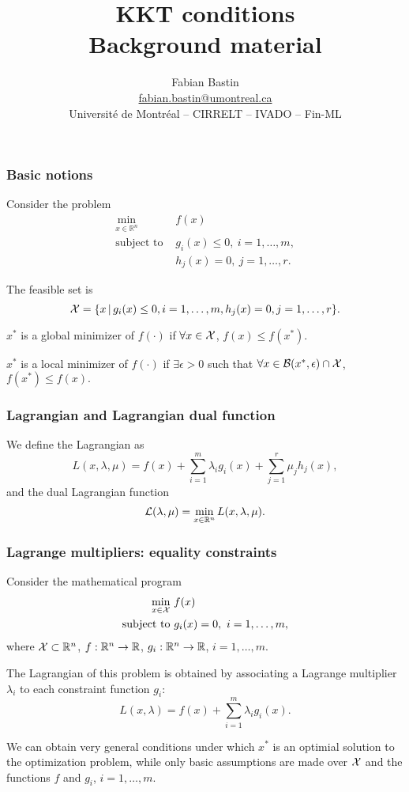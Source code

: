 \documentclass[usepdftitle=false]{beamer}
\author[Fabian Bastin]{Fabian Bastin \\ \url{fabian.bastin@umontreal.ca} \\ Université de Montréal -- CIRRELT -- IVADO -- Fin-ML}
\date{}
\title[Linear programming]{KKT conditions\\Background material}
\def\red{\color{red}}
\begin{document}
\frame{\titlepage}


\begin{frame}
\frametitle{Basic notions}

Consider the problem
\begin{align*}
	\min_{x \in \mathbb{R}^n} \ & f(x) \\
	\mbox{subject to } & g_i(x) \leq 0,\ i = 1,\ldots,m, \\
	& h_j(x) = 0,\ j = 1,\ldots,r.
\end{align*}

The feasible set is
$$
{\mathcal{X}} = \{ x \,|\, g_i(x) \leq 0, i = 1,\ldots,m, h_j(x) = 0, j = 1,\ldots,r \}.
$$

$x^*$ is a global minimizer of $f(\cdot)$ if $\forall x \in {\mathcal{X}}$, $f(x) \leq f(x^*)$.

$x^*$ is a local minimizer of $f(\cdot)$ if
$\exists \epsilon > 0$ such that $\forall x \in {\mathcal{B}}(x^*, \epsilon) \cap {\mathcal{X}}$, $f(x^*) \leq f(x).$

\end{frame}

\begin{frame}
	\frametitle{Lagrangian and Lagrangian dual function}
	
We define the Lagrangian as
	$$
	L(x, \lambda, \mu) = f(x) + \sum_{i = 1}^m \lambda_i g_i(x)
	+ \sum_{j = 1}^r \mu_j h_j(x),
	$$
and the dual Lagrangian function
	$$
	{\mathcal{L}}(\lambda, \mu) = \min_{x \in \mathbb{R}^n} L(x, \lambda, \mu).
	$$
	
\end{frame}

\begin{frame}
\frametitle{Lagrange multipliers: equality constraints}

Consider the mathematical program
\begin{align*}
\min_{x \in {\mathcal{X}}} \ & f(x) \\
\mbox{subject to } & g_i(x) = 0,\ i = 1,\ldots,m,
\end{align*}
where ${\mathcal{X}} \subset {\mathbb{R}}^n$, $f: {\mathbb{R}}^n \rightarrow {\mathbb{R}}$, $g_i: {\mathbb{R}}^n \rightarrow {\mathbb{R}}$, $i = 1,\ldots,m$.

\mbox{}

The {\red Lagrangian} of this problem is obtained by associating a Lagrange multiplier  $\lambda_i$ to each constraint function $g_i$:
$$
L(x, \lambda) = f(x) + \sum_{i = 1}^{m} \lambda_i g_i(x).
$$

We can obtain very general conditions under which $x^*$ is an optimial solution to the optimization problem, while only basic assumptions are made over ${\mathcal{X}}$ and the functions $f$ and $g_i$, $i = 1,\ldots,m$.

\end{frame}
\end{document}

